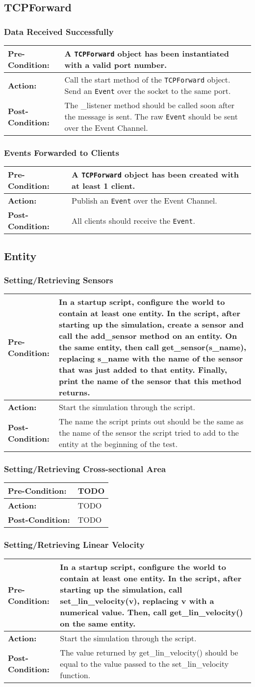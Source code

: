\documentclass[titlepage]{article}
\newcommand{\testcase}[3]{
    \begin{center}
    \begin{tabular}{| l | p{0.7\textwidth}|}
        \hline
        \rowcolor[gray]{0.8}\textbf{Pre-Condition:} & #1 \\ \hline
        \textbf{Action:} & #2 \\ \hline
        \rowcolor[gray]{0.8}\textbf{Post-Condition:} & #3 \\ \hline
    \end{tabular}
    \end{center}
}
\begin{document}
\subsection{TCPForward}
\subsubsection{Data Received Successfully}
\testcase{A \texttt{TCPForward} object has been instantiated with a valid port number.}{Call the start method of the
\texttt{TCPForward} object. Send an \texttt{Event} over the socket to the same port. }{The \_listener method should be called soon
after the message is sent. The raw \texttt{Event} should be sent over the Event Channel. }

\subsubsection{Events Forwarded to Clients}
\testcase{A \texttt{TCPForward} object has been created with at least 1 client.}{Publish an \texttt{Event} over the
Event Channel.}{All clients should receive the \texttt{Event}.}

\subsection{Entity}
\subsubsection{Setting/Retrieving Sensors}
\testcase{In a startup script, configure the world to contain at least one entity. In the script, after starting up the
simulation, create a sensor and call the add\_sensor method on an entity.  On the same entity, then call
get\_sensor(s\_name), replacing s\_name with the name of the sensor that was just added to that entity.  Finally, print the name of the sensor that this method returns.}{Start the simulation through the script.}{The name the script prints out should be the same as the name of the sensor the script tried to add to the entity at the beginning of the test.}

\subsubsection{Setting/Retrieving Cross-sectional Area}
\testcase{TODO}{TODO}{TODO}

\subsubsection{Setting/Retrieving Linear Velocity}
\testcase{In a startup script, configure the world to contain at least one entity. In the script, after starting up the
simulation, call set\_lin\_velocity(v), replacing v with a numerical value. Then, call get\_lin\_velocity() on the same entity.}{Start the simulation through the script.}{The value returned by get\_lin\_velocity() should be equal to the value passed to the set\_lin\_velocity function.}
\end{document}
